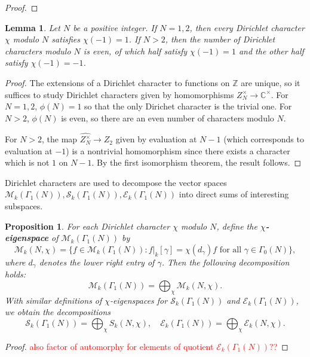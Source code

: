 \documentclass[10pt,leqno,twoside]{article}
\theoremstyle{plain}
\newtheorem{lemma}[lem]{Lemma}
\newtheorem{proposition}[lem]{Proposition}
\theoremstyle{definition}
\numberwithin{equation}{section}
\numberwithin{lem}{section}
\newcommand{\textib}[1]{\textbf{\textit{#1\index{#1}}}} %
\newcommand{\tbd}{{\Huge\color{red}{\textib{TBD}}}}
\newcommand{\sai}[1]{\textcolor{red}{#1}}
\begin{document}
\begin{proof}
    \tbd
\end{proof}
\begin{lemma}
    Let $N$ be a positive integer. If $N = 1,2$, then every Dirichlet character $\chi$ modulo $N$ satisfies $\chi(-1)=1$. If $N>2$, then the number of Dirichlet characters modulo $N$ is even, of which half satisfy $\chi(-1) = 1$ and the other half satisfy $\chi(-1) = -1$.
\end{lemma}
\begin{proof}
    The extensions of a Dirichlet character to functions on $\mathbb Z$ are unique, so it suffices to study Dirichlet characters given by homomorphisms $Z_N^\times\to\mathbb C^\times$. For $N = 1,2$, $\phi(N) = 1$ so that the only Dirichet character is the trivial one. For $N>2$, $\phi(N)$ is even, so there are an even number of characters modulo $N$.

    For $N>2$, the map $\widehat{Z_N^\times}\to Z_2$ given by evaluation at $N-1$ (which corresponds to evaluation at $-1$) is a nontrivial homomorphism since there exists a character which is not $1$ on $N-1$. By the first isomorphism theorem, the result follows.
\end{proof}
Dirichlet characters are used to decompose the vector spaces $\mathcal M_k(\varGamma_1(N)), \mathcal S_k(\varGamma_1(N)), \mathcal E_k(\varGamma_1(N))$ into direct sums of interesting subspaces.
\begin{proposition}\label{prop: eigenspace decomp}
    For each Dirichlet character $\chi$ modulo $N$, define the \textib{$\chi$-eigenspace} of $\mathcal M_k(\varGamma_1(N))$ by 
    \[\mathcal M_k(N,\chi) = \{f\in \mathcal M_k(\varGamma_1(N)) : f|_k[\gamma] = \chi(d_\gamma)f \text{ for all } \gamma\in\varGamma_0(N)\},\] where $d_\gamma$ denotes the lower right entry of $\gamma$. Then the following decomposition holds:
    \[\mathcal M_k(\varGamma_1(N)) = \bigoplus_\chi\mathcal M_k(N,\chi).\] With similar definitions of $\chi$-eigenspaces for $\mathcal S_k(\varGamma_1(N))$ and $\mathcal E_k(\varGamma_1(N))$, we obtain the decompositions
    \[\mathcal S_k(\varGamma_1(N)) = \bigoplus_\chi S_k(N,\chi),\quad \mathcal E_k(\varGamma_1(N)) = \bigoplus_\chi \mathcal E_k(N,\chi).\]
\end{proposition}
\begin{proof}
    \tbd \sai{also factor of automorphy for elements of quotient $\mathcal E_k(\varGamma_1(N))$??}
\end{proof}
\end{document}
